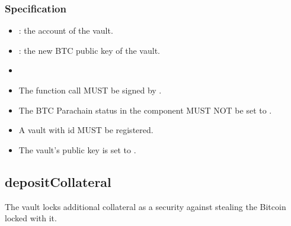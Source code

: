 \documentclass[a4paper,10pt,english]{sphinxmanual}
\begin{document}
\subsubsection{Specification}
\label{\detokenize{spec/vault-registry:id8}}


\begin{itemize}
\item {} 
: the account of the vault.

\item {} 
: the new BTC public key of the vault.

\end{itemize}

\begin{itemize}
\item {} 

\end{itemize}

\begin{itemize}
\item {} 
The function call MUST be signed by .

\item {} 
The BTC Parachain status in the {\hyperref[\detokenize{spec/security:security}]{}} component MUST NOT be set to .

\item {} 
A vault with id  MUST be registered.

\end{itemize}

\begin{itemize}
\item {} 
The vault’s public key is set to .

\end{itemize}


\subsection{depositCollateral}
\label{\detokenize{spec/vault-registry:depositcollateral}}\label{\detokenize{spec/vault-registry:id9}}
The vault locks additional collateral as a security against stealing the Bitcoin locked with it.
\end{document}
